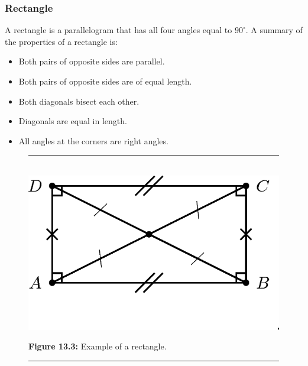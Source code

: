 \subsubsection{ Rectangle}
A rectangle is a parallelogram that has all four angles equal to ${90}^{\circ }$. A summary of the properties of a rectangle is:\par 
\begin{itemize}[noitemsep]
\item Both pairs of opposite sides are parallel.
\item Both pairs of opposite sides are of equal length.
\item Both diagonals bisect each other.
\item Diagonals are equal in length.
\item All angles at the corners are right angles.
\end{itemize}
\setcounter{subfigure}{0}
\begin{figure}[H] %
\begin{center}
\rule[.1in]{\figurerulewidth}{.005in} \\
\label{m39354*uid68!!!underscore!!!media}\label{m39354*uid68!!!underscore!!!printimage}\includegraphics{col11306.imgs/m39354_MG10C13_042.png} %
\vspace{2pt}
\vspace{\rubberspace}\par \begin{cnxcaption}
\small \textbf{Figure 13.3: }Example of a rectangle.
\end{cnxcaption}
\vspace{.1in}
\rule[.1in]{\figurerulewidth}{.005in} \\
\end{center}
\end{figure}       

